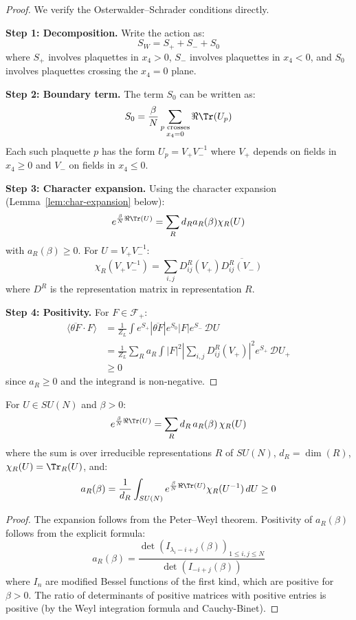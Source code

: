 \begin{proof}
We verify the Osterwalder--Schrader conditions directly.

\textbf{Step 1: Decomposition.}
Write the action as:
\[
S_W = S_+ + S_- + S_0
\]
where $S_+$ involves plaquettes in $x_4 > 0$, $S_-$ involves plaquettes in $x_4 < 0$, 
and $S_0$ involves plaquettes crossing the $x_4 = 0$ plane.

\textbf{Step 2: Boundary term.}
The term $S_0$ can be written as:
\[
S_0 = \frac{\beta}{N} \sum_{\substack{p \text{ crosses} \\ x_4 = 0}} \Re\Tr(U_p)
\]
Each such plaquette $p$ has the form $U_p = V_+ V_-^{-1}$ where $V_+$ depends on 
fields in $x_4 \geq 0$ and $V_-$ on fields in $x_4 \leq 0$.

\textbf{Step 3: Character expansion.}
Using the character expansion (Lemma~\ref{lem:char-expansion} below):
\[
e^{\frac{\beta}{N}\Re\Tr(U)} = \sum_R d_R a_R(\beta) \chi_R(U)
\]
with $a_R(\beta) \geq 0$. For $U = V_+ V_-^{-1}$:
\[
\chi_R(V_+ V_-^{-1}) = \sum_{i,j} D^R_{ij}(V_+) \overline{D^R_{ij}(V_-)}
\]
where $D^R$ is the representation matrix in representation $R$.

\textbf{Step 4: Positivity.}
For $F \in \mathcal{F}_+$:
\begin{align*}
\langle \overline{\theta F} \cdot F \rangle &= \frac{1}{Z_L} \int e^{S_+} |\overline{\theta F}| e^{S_0} |F| e^{S_-} \, \mathcal{D}U \\
&= \frac{1}{Z_L} \sum_R a_R \int |F|^2 \left|\sum_{i,j} D^R_{ij}(V_+)\right|^2 e^{S_+} \, \mathcal{D}U_+ \\
&\geq 0
\end{align*}
since $a_R \geq 0$ and the integrand is non-negative.
\end{proof}

\begin{lemma}
\label{lem:char-expansion}
\label{lem:character-expansion}
For $U \in SU(N)$ and $\beta > 0$:
\[
e^{\frac{\beta}{N}\Re\Tr(U)} = \sum_{R} d_R \, a_R(\beta) \, \chi_R(U)
\]
where the sum is over irreducible representations $R$ of $SU(N)$, $d_R = \dim(R)$, 
$\chi_R(U) = \Tr_R(U)$, and:
\[
a_R(\beta) = \frac{1}{d_R} \int_{SU(N)} e^{\frac{\beta}{N}\Re\Tr(U)} \chi_R(U^{-1}) \, dU \geq 0
\]
\end{lemma}

\begin{proof}
The expansion follows from the Peter--Weyl theorem. Positivity of $a_R(\beta)$ 
follows from the explicit formula:
\[
a_R(\beta) = \frac{\det\left(I_{\lambda_i - i + j}(\beta)\right)_{1 \leq i,j \leq N}}{\det\left(I_{-i+j}(\beta)\right)}
\]
where $I_n$ are modified Bessel functions of the first kind, which are positive for 
$\beta > 0$. The ratio of determinants of positive matrices with positive entries 
is positive (by the Weyl integration formula and Cauchy-Binet).
\end{proof}

